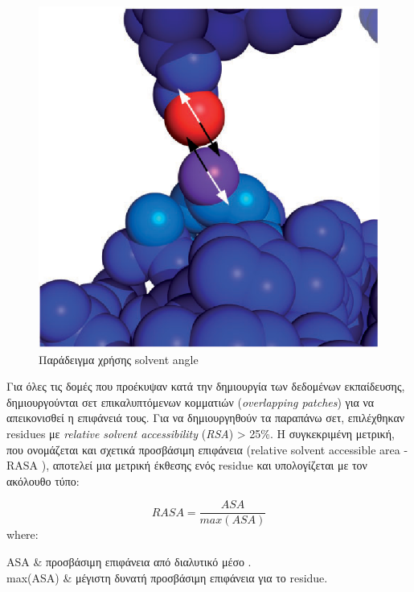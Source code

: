 \medskip
\begin{figure}[h]
  \centering
  \includegraphics[scale=0.5]{images/solvang.png}
  \caption{Παράδειγμα χρήσης solvent angle}
  \label{fig:solvang}
\end{figure}

\medskip
Για όλες τις δομές που προέκυψαν κατά την δημιουργία των δεδομένων εκπαίδευσης, δημιουργούνται σετ επικαλυπτόμενων κομματιών (\textit{overlapping patches}) για να απεικονισθεί η επιφάνειά τους. Για να δημιουργηθούν τα παραπάνω σετ, επιλέχθηκαν residues με \textit{relative solvent accessibility} (\textit{RSA}) > 25\%. Η συγκεκριμένη μετρική, που ονομάζεται και σχετικά προσβάσιμη επιφάνεια (relative solvent accessible area - RASA ), αποτελεί μια μετρική έκθεσης ενός residue και υπολογίζεται με τον ακόλουθο τύπο:

\begin{equation}
    RASA = \frac{ASA}{max(ASA)} 
\end{equation}
where:


{
\centering
\begin{conditions}
   ASA & προσβάσιμη επιφάνεια από διαλυτικό μέσο . \\
   max(ASA) & μέγιστη δυνατή προσβάσιμη επιφάνεια για το residue. \\
\end{conditions}}

